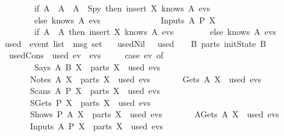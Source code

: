 \begin{isabellebody}
  \ \ \ \ \ \ \ \ if\ {\isacharparenleft}A\ {\isacharequal}\ A{\isacharprime}\ {\isacharampersand}\ A\ {\isasymnoteq}\ Spy{\isacharparenright}\ then\ insert\ X\ {\isacharparenleft}knows\ A\ evs{\isacharparenright}\isanewline
  \ \ \ \ \ \ \ \ else\ knows\ A\ evs\isanewline
  \isanewline
  \ \ \ \ \ \ %
  \isanewline
  \ \ \ \ \ \ {\isacharbar}\ Inputs\ A{\isacharprime}\ P\ X\ {\isasymRightarrow}\isanewline
  \ \ \ \ \ \ \ \ if\ {\isacharparenleft}A\ {\isacharequal}\ A{\isacharprime}{\isacharparenright}\ then\ insert\ X\ {\isacharparenleft}knows\ A\ evs{\isacharparenright}\isanewline
  \ \ \ \ \ \ \ \ else\ knows\ A\ evs\isanewline
  \ \ {\isacharparenright}{\isachardoublequoteclose}\isanewline
  \isanewline
  \isanewline
  \isamarkupfalse%
  \ used\ {\isacharcolon}{\isacharcolon}\ {\isachardoublequoteopen}event\ list\ {\isasymRightarrow}\ msg\ set{\isachardoublequoteclose}\ \isanewline
  \ \ used{\isacharunderscore}Nil\ \ {\isacharcolon}\ {\isachardoublequoteopen}used\ {\isacharbrackleft}{\isacharbrackright}\ {\isacharequal}\ {\isacharparenleft}{\isasymUnion}\ B{\isachardot}\ parts\ {\isacharparenleft}initState\ B{\isacharparenright}{\isacharparenright}{\isachardoublequoteclose}\ {\isacharbar}\isanewline
  \ \ used{\isacharunderscore}Cons\ {\isacharcolon}\ {\isachardoublequoteopen}used\ {\isacharparenleft}ev\ {\isacharhash}\ evs{\isacharparenright}\ {\isacharequal}\isanewline
  \ \ \ \ {\isacharparenleft}case\ ev\ of\isanewline
  \ \ \ \ \ \ \ \ Says\ A\ B\ X\ {\isasymRightarrow}\ parts\ {\isacharbraceleft}X{\isacharbraceright}\ {\isasymunion}\ {\isacharparenleft}used\ evs{\isacharparenright}\isanewline
  \ \ \ \ \ \ {\isacharbar}\ Notes\ A\ X\ {\isasymRightarrow}\ parts\ {\isacharbraceleft}X{\isacharbraceright}\ {\isasymunion}\ {\isacharparenleft}used\ evs{\isacharparenright}\isanewline
  \ \ \ \ \ \ {\isacharbar}\ Gets\ A\ X\ {\isasymRightarrow}\ used\ evs\isanewline
  \ \ \ \ \ \ {\isacharbar}\ Scans\ A\ P\ X\ {\isasymRightarrow}\ parts\ {\isacharbraceleft}X{\isacharbraceright}\ {\isasymunion}\ used\ evs\isanewline
  \ \ \ \ \ \ {\isacharbar}\ SGets\ P\ X\ {\isasymRightarrow}\ parts\ {\isacharbraceleft}X{\isacharbraceright}\ {\isasymunion}\ used\ evs\isanewline
  \ \ \ \ \ \ {\isacharbar}\ Shows\ P\ A\ X\ {\isasymRightarrow}\ parts\ {\isacharbraceleft}X{\isacharbraceright}\ {\isasymunion}\ used\ evs\isanewline
  \ \ \ \ \ \ {\isacharbar}\ AGets\ A\ X\ {\isasymRightarrow}\ used\ evs\isanewline
  \ \ \ \ \ \ {\isacharbar}\ Inputs\ A\ P\ X\ {\isasymRightarrow}\ parts\ {\isacharbraceleft}X{\isacharbraceright}\ {\isasymunion}\ used\ evs\isanewline

\end{isabellebody}
